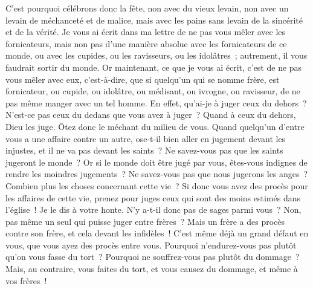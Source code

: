 \begin{multicols}{2}
C'est pourquoi célébrons donc la fête, non avec du vieux levain, non avec un levain de méchanceté et de malice, mais avec les pains sans levain de la sincérité et de la vérité.
Je vous ai écrit dans ma lettre de ne pas vous mêler avec les fornicateurs,
mais non pas d'une manière absolue avec les fornicateurs de ce monde, ou avec les cupides, ou les ravisseurs, ou les idolâtres~; autrement, il vous faudrait sortir du monde.
Or maintenant, ce que je vous ai écrit, c'est de ne pas vous mêler avec eux, c'est-à-dire, que si quelqu'un qui se nomme frère, est fornicateur, ou cupide, ou idolâtre, ou médisant, ou ivrogne, ou ravisseur, de ne pas même manger avec un tel homme.
En effet, qu'ai-je à juger ceux du dehors~? N'est-ce pas ceux du dedans que vous avez à juger~?
Quand à ceux du dehors, Dieu les juge. Ôtez donc le méchant du milieu de vous.
\VerseOne{}Quand quelqu'un d'entre vous a une affaire contre un autre, ose-t-il bien aller en jugement devant les injustes, et il ne va pas devant les saints~?
Ne savez-vous pas que les saints jugeront le monde~? Or si le monde doit être jugé par vous, êtes-vous indignes de rendre les moindres jugements~?
Ne savez-vous pas que nous jugerons les anges~? Combien plus les choses concernant cette vie~?
Si donc vous avez des procès pour les affaires de cette vie, prenez pour juges ceux qui sont des moins estimés dans l'église~!
Je le dis à votre honte. N'y a-t-il donc pas de sages parmi vous~? Non, pas même un seul qui puisse juger entre frères~?
Mais un frère a des procès contre son frère, et cela devant les infidèles~!
C'est même déjà un grand défaut en vous, que vous ayez des procès entre vous. Pourquoi n'endurez-vous pas plutôt qu'on vous fasse du tort~? Pourquoi ne souffrez-vous pas plutôt du dommage~? 
Mais, au contraire, vous faites du tort, et vous causez du dommage, et même à vos frères~!

\end{multicols}
